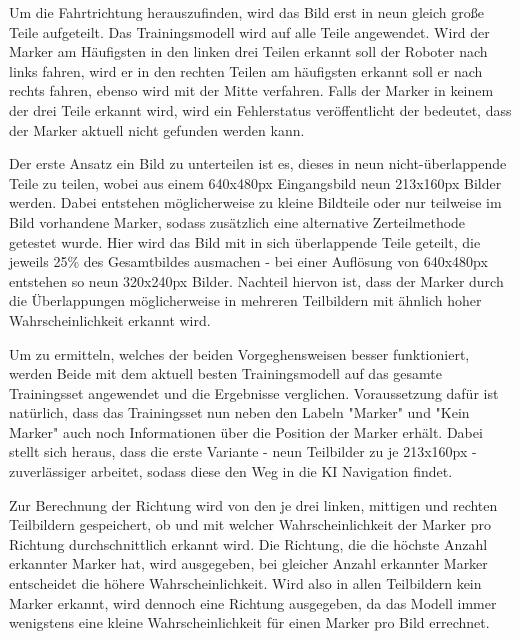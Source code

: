 \documentclass[conference]{IEEEtran}
\begin{document}
Um die Fahrtrichtung herauszufinden, wird das Bild erst in neun gleich 
gro{\ss}e Teile aufgeteilt. Das Trainingsmodell wird auf alle Teile 
angewendet.
Wird der Marker am Häufigsten in den linken drei Teilen erkannt soll der 
Roboter nach links fahren, wird er in den rechten Teilen am häufigsten 
erkannt soll er nach rechts fahren, ebenso wird mit der Mitte verfahren.
Falls der Marker in keinem der drei Teile erkannt wird, wird ein Fehlerstatus veröffentlicht der bedeutet, dass der Marker aktuell nicht gefunden werden kann.

Der erste Ansatz ein Bild zu unterteilen ist es, dieses in neun nicht-überlappende Teile zu teilen, wobei aus einem 640x480px Eingangsbild neun 213x160px Bilder werden. 
Dabei entstehen möglicherweise zu kleine Bildteile oder nur teilweise im 
Bild vorhandene Marker, sodass zusätzlich eine alternative Zerteilmethode 
getestet wurde. 
Hier wird das Bild mit in sich überlappende Teile geteilt, die jeweils 25\% des Gesamtbildes ausmachen - bei einer Auflösung von 640x480px entstehen so neun 320x240px Bilder.
Nachteil hiervon ist, dass der Marker durch die Überlappungen möglicherweise in mehreren Teilbildern mit ähnlich hoher Wahrscheinlichkeit erkannt wird.


Um zu ermitteln, welches der beiden Vorgeghensweisen besser funktioniert, 
werden Beide mit dem aktuell besten Trainingsmodell auf das 
gesamte Trainingsset angewendet und die Ergebnisse verglichen.
Voraussetzung dafür ist natürlich, dass das Trainingsset nun neben den Labeln "Marker" und "Kein Marker" auch noch Informationen über die Position der Marker erhält.
Dabei stellt sich heraus, dass die erste Variante - neun Teilbilder zu je 213x160px - zuverlässiger arbeitet, sodass diese den Weg in die KI Navigation findet.


Zur Berechnung der Richtung wird von den je drei linken, mittigen und rechten Teilbildern gespeichert, ob und mit welcher Wahrscheinlichkeit der Marker pro Richtung durchschnittlich erkannt wird.
Die Richtung, die die höchste Anzahl erkannter Marker hat, wird ausgegeben, bei gleicher Anzahl erkannter Marker entscheidet die höhere Wahrscheinlichkeit.
Wird also in allen Teilbildern kein Marker erkannt, wird dennoch eine Richtung ausgegeben, da das Modell immer wenigstens eine kleine Wahrscheinlichkeit für einen Marker pro Bild errechnet.
\end{document}

